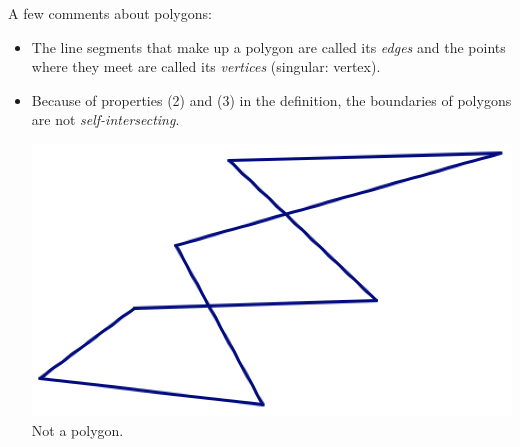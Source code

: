 A few comments about polygons:
\begin{itemize}
\item
The line segments that make up a polygon are called its \emph{edges} and the points where they meet are called its \emph{vertices} (singular: vertex).\\

\item
Because of properties (2) and (3) in the definition, the boundaries of polygons are not \emph{self-intersecting}.\\

\begin{center}
\includegraphics[scale=0.35]{notpoly} \\
Not a polygon.\\
\end{center}


\end{itemize}
